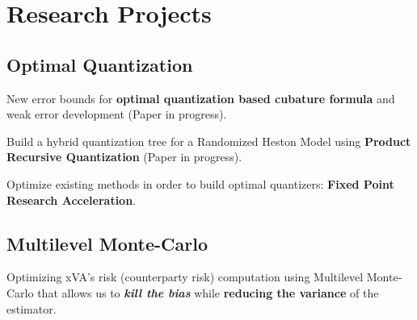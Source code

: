 \documentclass[]{deedy-resume-openfont}
\begin{document}
%
%
\lastupdated

%
%

%
%

\begin{minipage}[t]{0.33\textwidth}



\section{Research Projects}

\subsection{Optimal Quantization}
\vspace{\topsep}
\begin{tightemize}
\item New error bounds for \textbf{optimal quantization based cubature formula} and weak error development (Paper in progress).
\item Build a hybrid quantization tree for a Randomized Heston Model using \textbf{Product Recursive Quantization} (Paper in progress).
\item Optimize existing methods in order to build optimal quantizers: \textbf{Fixed Point Research Acceleration}. 
\end{tightemize}
\sectionsep
\subsection{Multilevel Monte-Carlo}
\vspace{\topsep}
\begin{tightemize}
\item Optimizing xVA's risk (counterparty risk) computation using Multilevel Monte-Carlo that allows us to \textbf{\textit{kill the bias}} while \textbf{reducing the variance} of the estimator. 
\end{tightemize}





\end{minipage}
\end{document}
